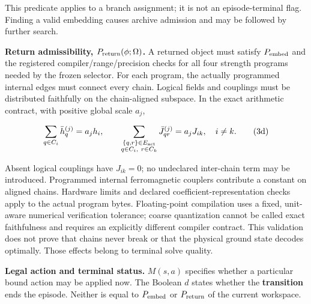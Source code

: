 \documentclass[10pt,a4paper]{article}
\begin{document}
This predicate applies to a branch assignment; it is not an
episode-terminal flag. Finding a valid embedding causes archive
admission and may be followed by further search.

\textbf{Return admissibility, \(P_{\rm return}(\phi;\Omega)\).} A
returned object must satisfy \(P_{\rm embed}\) and the registered
compiler/range/precision checks for all four strength programs needed by
the frozen selector. For each program, the actually programmed internal
edges must connect every chain. Logical fields and couplings must be
distributed faithfully on the chain-aligned subspace. In the exact
arithmetic contract, with positive global scale \(a_j\),

\[
\sum_{q\in C_i}\bar h_q^{(j)}=a_jh_i,
\qquad
\sum_{\substack{\{q,r\}\in E_{\rm act}\\q\in C_i,\ r\in C_k}}
\bar J_{qr}^{(j)}=a_jJ_{ik},\quad i\ne k.
\tag{3d}
\]

Absent logical couplings have \(J_{ik}=0\); no undeclared inter-chain
term may be introduced. Programmed internal ferromagnetic couplers
contribute a constant on aligned chains. Hardware limits and declared
coefficient-representation checks apply to the actual program bytes.
Floating-point compilation uses a fixed, unit-aware numerical
verification tolerance; coarse quantization cannot be called exact
faithfulness and requires an explicitly different compiler contract.
This validation does not prove that chains never break or that the
physical ground state decodes optimally. Those effects belong to
terminal solve quality.

\textbf{Legal action and terminal status.} \(M(s,a)\) specifies whether
a particular bound action may be applied now. The Boolean \(d\) states
whether the \textbf{transition} ends the episode. Neither is equal to
\(P_{\rm embed}\) or \(P_{\rm return}\) of the current workspace.

\begingroup\small
\end{document}
